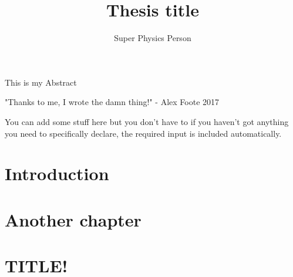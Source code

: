 \documentclass[]{yorkThesis}  %
\title{Thesis title}
\author{Super Physics Person}
\begin{document}
\titlePage
\abstract
{}
This is my Abstract

\contents

\acknowledgments
{}
"Thanks to me, I wrote the damn thing!" - Alex Foote 2017

\declaration
You can add some stuff here but you don't have to if you haven't got anything you need to specifically declare, the required input is included automatically.

\pagestyle{headings}
\chapter{Introduction}\label{chapter1}


\chapter{Another chapter}\label{chapter2}


\appendix
\chapter{TITLE!}
\label{Appendix1}

%

{}  %


\end{document}
